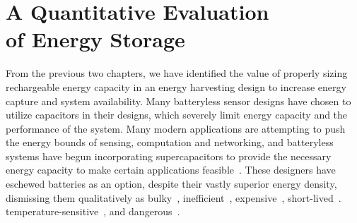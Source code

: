 \chapter[A Quantitative Evaluation of Energy Storage]{A Quantitative Evaluation\\of Energy Storage}
\label{chap:battery}

From the previous two chapters, we have identified the value of properly sizing rechargeable energy capacity in an energy harvesting design to increase energy capture and system availability. 
Many batteryless sensor designs have chosen to utilize capacitors in their designs, which severely limit energy capacity and the performance of the system. 
Many modern applications are attempting to push the energy bounds of sensing, computation and networking, and batteryless systems have begun incorporating supercapacitors to provide the necessary energy capacity to make certain applications feasible~\cite{nardello2019camaroptera}.
These designers have eschewed batteries as an option, despite their vastly superior energy density, dismissing them qualitatively as 
bulky~\cite{yervaGrafting12, hester2017future, hesterTragedy15, luciaIntermittent17, hesterFlicker17, hesterTimely17, colinReconfigurable18, yildirim2018ink, nardello2019camaroptera, geissdoerfer2019shepherd, majid2020continuous, shukla2019skinnypower},
inefficient~\cite{yervaGrafting12, luciaIntermittent17, nardello2019camaroptera, shukla2019skinnypower},
expensive~\cite{hester2017future, hesterTragedy15, hesterFlicker17, hesterTimely17, yildirim2018ink, majid2020continuous},
short-lived~\cite{hester2017future, hesterFlicker17, hesterTimely17, colinReconfigurable18, luciaIntermittent17, yervaGrafting12, shukla2019skinnypower, geissdoerfer2019shepherd, nardello2019camaroptera, fraternali2020ember, majid2020continuous}.
temperature-sensitive~\cite{hester2017future, hesterFlicker17, hesterTimely17, luciaIntermittent17, colinReconfigurable18},
and dangerous~\cite{hester2017future, hesterFlicker17, hesterTimely17,  yildirim2018ink, geissdoerfer2019shepherd, majid2020continuous}. 

